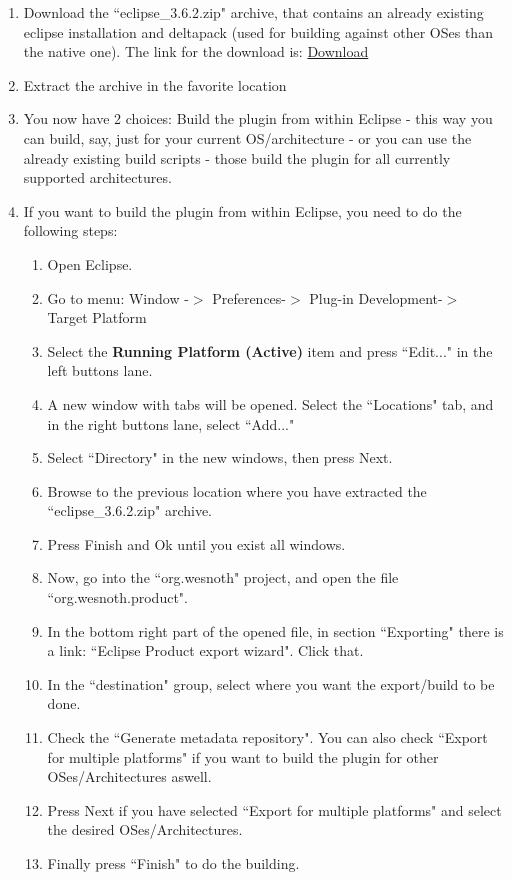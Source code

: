 \documentclass[10pt]{article}
\begin{document}
\begin{enumerate}
  \item Download the ``eclipse\_3.6.2.zip" archive, that contains an already existing eclipse installation and deltapack (used for building against other OSes than the native one). The link for the download is: \href{http://sourceforge.net/projects/wesnoth/files/wesnoth-umcplugin/build\_utils/eclipse\_3.6.2.zip/download}{Download}
  
  \item Extract the archive in the favorite location
  
  \item You now have 2 choices: Build the plugin from within Eclipse - this way you can build, say, just for your current OS/architecture - or you can use the already existing build scripts - those build the plugin for all currently supported architectures.
  
  \item If you want to build the plugin from within Eclipse, you need to do the following steps:
  \begin{enumerate}
    \item Open Eclipse.
    \item Go to menu: Window -$>$ Preferences-$>$ Plug-in Development-$>$ Target Platform
    \item Select the \textbf{Running Platform (Active)} item and press ``Edit..." in the left buttons lane.
    \item A new window with tabs will be opened. Select the ``Locations" tab, and in the right buttons lane, select ``Add..."
    \item Select ``Directory" in the new windows, then press Next.
    \item Browse to the previous location where you have extracted the ``eclipse\_3.6.2.zip" archive.
    \item Press Finish and Ok until you exist all windows.
    \item Now, go into the ``org.wesnoth" project, and open the file ``org.wesnoth.product".
    \item In the bottom right part of the opened file, in section ``Exporting" there is a link: ``Eclipse Product export wizard". Click that.
    \item In the ``destination" group, select where you want the export/build to be done. 
    \item Check the ``Generate metadata repository". You can also check ``Export for multiple platforms" if you want to build the plugin for other OSes/Architectures aswell.
    \item Press Next if you have selected ``Export for multiple platforms" and select the desired OSes/Architectures.
    \item Finally press ``Finish" to do the building.
  \end{enumerate}
  

\end{enumerate}
\end{document}
